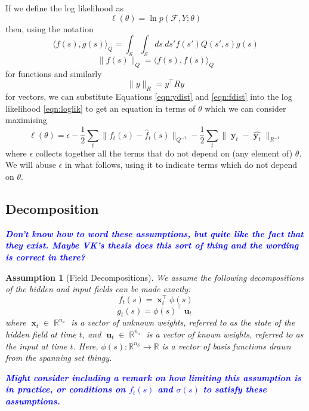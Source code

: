 \documentclass{IEEEtran}
\newcommand{\todo}[1]{\textsf{\emph{\textbf{\textcolor{blue}{#1}}}}}
\newcommand{\inner}[3]{\langle#1,#2\rangle_{#3}}
\newcommand{\dist}[2]{\|#1\|_{#2}}
\DeclareMathOperator{\R}{\mathbb{R}}
\DeclareMathOperator{\xvec}{\mathbf{x}}
\DeclareMathOperator{\uvec}{\mathbf{u}}
\DeclareMathOperator{\yvec}{\mathbf{y}}
\DeclareMathOperator{\onto}{\rightarrow}
\newtheorem{assumption}{Assumption}
\begin{document}
If we define the log likelihood as
\begin{equation}
	\label{eqn:loglik}
	\ell(\theta) = \ln p(\mathcal{F}, Y;\theta)
\end{equation}
then, using the notation
\begin{equation}
	\inner{f(s)}{g(s)}{Q} = \int_\mathcal{S} \int_\mathcal{S} ds~ds' f(s') Q(s',s) g(s)
\end{equation}
\begin{equation}
	\dist{f(s)}{Q} = \inner{f(s)}{f(s)}{Q}
\end{equation}
for functions and similarly
\begin{equation}
	\dist{y}{R} = y^\top Ry
\end{equation}
for vectors, we can substitute Equations \ref{eqn:ydist} and \ref{eqn:fdist} into the log likelihood \ref{eqn:loglik} to get an equation in terms of $\theta$ which we can consider maximising 
\begin{equation}
	\ell(\theta) =  \epsilon  - \frac{1}{2}\sum_t\dist{f_t(s) - \hat{f}_t(s)}{Q^{-1}} - \frac{1}{2}\sum_t\dist{\yvec_t-\hat{\yvec_t}}{R^{-1}}
\end{equation}
where $\epsilon$ collects together all the terms that do not depend on (any element of) $\theta$. We will abuse $\epsilon$ in what follows, using it to indicate terms which do not depend on $\theta$.

\subsection{Decomposition}

\todo{Don't know how to word these assumptions, but quite like the fact that they exist. Maybe VK's thesis does this sort of thing and the wording is correct in there?}

\begin{assumption}[Field Decompositions]
	\label{ass:fielddecomp}
	We assume the following decompositions of the hidden and input fields can be made exactly:
\begin{equation}
	\label{eq:f decomp}
	f_t(s) = \xvec_t^\top\phi(s)
\end{equation}
\begin{equation}
	g_t(s) = \phi(s)^\top\uvec_t
\end{equation}	 
where $\xvec_t \in \R^{n_x}$ is a vector of unknown weights, referred to as the state of the hidden field at time $t$, and $\uvec_t \in \R^{n_x}$ is a vector of known weights, referred to as the input at time $t$. Here, $\phi(s) : \mathbb{R}^{n_\mathcal{S}} \onto \mathbb{R}$ is a vector of basis functions drawn from the spanning set thingy.
\end{assumption}
\todo{Might consider including a remark on how limiting this assumption is in practice, or conditions on $f_t(s)$ and $\sigma(s)$ to satisfy these assumptions.}
\end{document}
